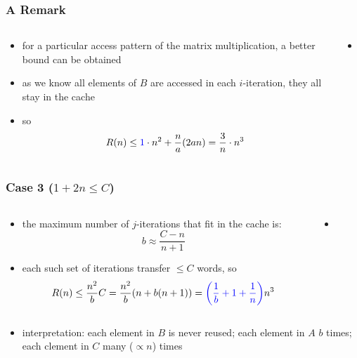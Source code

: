 \documentclass[12pt,dvipdfmx]{beamer}
\newcommand{\ao}[1]{{\color{blue}#1}}
\begin{document}
\begin{frame}[fragile]
\frametitle{A Remark}
\begin{columns}
  \begin{column}{0.5\textwidth}
    \begin{itemize}
    \item for a particular access pattern of the
      matrix multiplication,
      a better bound can be obtained
    \item as we know all elements of $B$ are accessed in each $i$-iteration,
      they all stay in the cache
    \item so
      \[ R(n) \leq \ao{1} \cdot n^2 + \frac{n}{a} (2an)
        = \frac{3}{n} \cdot n^3
      \]
\end{itemize}
\end{column}

\begin{column}{0.5\textwidth}
  \begin{itemize}
  \item []
{\tiny\def\svgwidth{0.9\textwidth}
}
\end{itemize}
\end{column}
\end{columns}

\end{frame}


\begin{frame}
\frametitle{Case 3 ($1 + 2n \leq C$)}
\begin{columns}
  \begin{column}{0.5\textwidth}
\begin{itemize}
\item the maximum number of $j$-iterations
  that fit in the cache is:
\[ b \approx \frac{C - n}{n + 1} \]
\item each such set of iterations transfer $\leq C$ words, so
\[ R(n) \leq \frac{n^2}{b} C 
= \frac{n^2}{b} (n + b(n + 1))
= \ao{\left(\frac{1}{b} + 1 + \frac{1}{n} \right)} n^3
\]
\end{itemize}
  \end{column}

  \begin{column}{0.5\textwidth}
    \begin{itemize}
    \item []
{\tiny\def\svgwidth{0.9\textwidth}}
\end{itemize}
\end{column}
\end{columns}

\begin{itemize}
\item []
\ao{interpretation:} each element in $B$ is never reused; 
each element in $A$ $b$ times; 
each clement in $C$ many ($\propto n$) times 
\end{itemize}
\end{frame}
\end{document}
